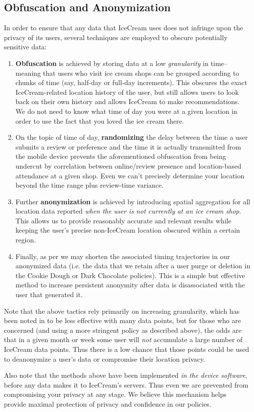 \documentclass{article}
\providecommand{\tightlist}{
    \setlength{\itemsep}{0pt}\setlength{\parskip}{0pt}
}
\begin{document}
\subsection{Obfuscation and Anonymization}
In order to ensure that any data that IceCream uses does not infringe upon the privacy of its users, several techniques are employed to obscure potentially sensitive data:
\begin{enumerate}\tightlist
  \item \textbf{Obfuscation} is achieved by storing data at a low \textit{granularity} in time--meaning that users who visit ice cream shops can be grouped according to chunks of time (say, half-day or full-day increments). This obscures the exact IceCream-related location history of the user, but still allows users to look back on their own history and allows IceCream to make recommendations. We do not need to know what time of day you were at a given location in order to use the fact that you loved the ice cream there.
  \item On the topic of time of day, \textbf{randomizing} the delay between the time a user submits a review or preference and the time it is actually transmitted from the mobile device prevents the aforementioned obfuscation from being undercut by correlation between online/review presence and location-based attendance at a given shop. Even we can't precisely determine your location beyond the time range plus review-time variance.
  \item Further \textbf{anonymization} is achieved by introducing spatial aggregation for all location data reported \textit{when the user is not currently at an ice cream shop}. This allows us to provide reasonably accurate and relevant results while keeping the user's precise non-IceCream location obscured within a certain region.
  \item Finally, as per \cite{song2014not} we may shorten the associated timing trajectories in our anonymized data (i.e. the data that we retain after a user purge or deletion in the Cookie Dough or Dark Chocolate policies). This is a simple but effective method to increase persistent anonymity after data is disassociated with the user that generated it.
\end{enumerate}

Note that the above tactics rely primarily on increasing granularity, which has been noted in \cite{de2013unique} to be less effective with many data points, but for those who are concerned (and using a more stringent policy as described above), the odds are that in a given month or week some user will \textit{not} accumulate a large number of IceCream data points. Thus there is a low chance that those points could be used to deanonymize a user's data or compromise their location privacy. \par
Also note that the methods above have been implemented \textit{in the device software}, before any data makes it to IceCream's servers. Thus even we are prevented from compromising your privacy at any stage. We believe this mechanism helps provide maximal protection of privacy and confidence in our policies.
\end{document}

